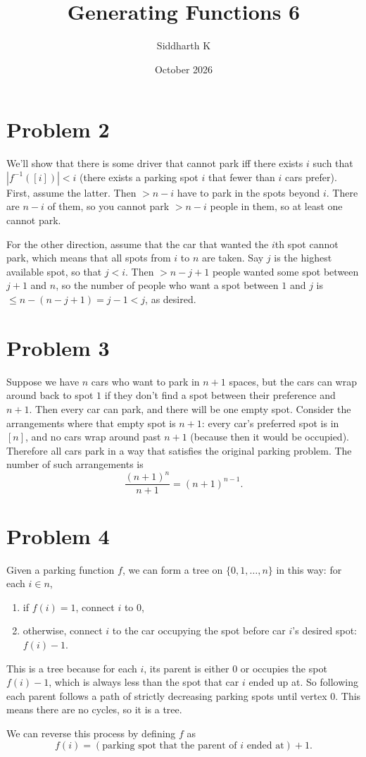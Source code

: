 \documentclass{article}
\title{Generating Functions 6}
\author{Siddharth K}
\date{October 2026}
\newcommand{\problem}[1]{\section*{Problem #1}}
\begin{document}
\maketitle

\problem{2}
We'll show that there is some driver that cannot park iff there exists $i$ such that $|f^{-1}([i])| < i$ (there exists a parking spot $i$ that fewer than $i$ cars prefer). First, assume the latter. Then $> n - i$ have to park in the spots beyond $i$. There are $n - i$ of them, so you cannot park $> n - i$ people in them, so at least one cannot park.

For the other direction, assume that the car that wanted the $i$th spot cannot park, which means that all spots from $i$ to $n$ are taken. Say $j$ is the highest available spot, so that $j < i$. Then $> n - j + 1$ people wanted some spot between $j + 1$ and $n$, so the number of people who want a spot between $1$ and $j$ is $\le n - (n - j + 1) = j - 1 < j$, as desired.

\problem{3}
Suppose we have $n$ cars who want to park in $n + 1$ spaces, but the cars can wrap around back to spot $1$ if they don't find a spot between their preference and $n + 1$. Then every car can park, and there will be one empty spot. Consider the arrangements where that empty spot is $n + 1$: every car's preferred spot is in $[n]$, and no cars wrap around past $n + 1$ (because then it would be occupied). Therefore all cars park in a way that satisfies the original parking problem. The number of such arrangements is
\[
    \frac{(n + 1)^n}{n + 1} = (n + 1)^{n - 1}.
\]

\problem{4}
Given a parking function $f$, we can form a tree on $\{0, 1, \ldots, n\}$ in this way: for each $i \in n$,

\begin{enumerate}
    \item if $f(i) = 1$, connect $i$ to $0$,
    \item otherwise, connect $i$ to the car occupying the spot before car $i$'s desired spot: $f(i) - 1$.
\end{enumerate}

This is a tree because for each $i$, its parent is either $0$ or occupies the spot $f(i) - 1$, which is always less than the spot that car $i$ ended up at. So following each parent follows a path of strictly decreasing parking spots until vertex $0$. This means there are no cycles, so it is a tree.

We can reverse this process by defining $f$ as
\[
    f(i) = (\text{parking spot that the parent of } i \text{ ended at}) + 1.
\]
\end{document}
